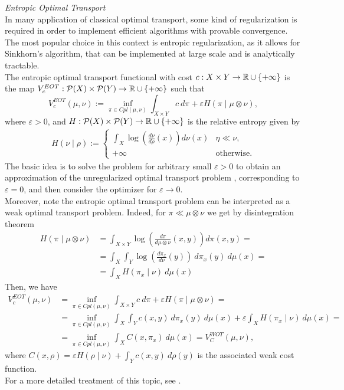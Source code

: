 \documentclass[../main.tex]{subfiles}
\begin{document}
\begin{example} \textit{Entropic Optimal Transport} \\
    In many application of classical optimal transport, some kind of regularization is required in order to implement efficient algorithms with provable convergence. The most popular choice in this context is entropic regularization, as it allows for Sinkhorn's algorithm, that can be implemented at large scale and is analytically tractable. \\
    The entropic optimal transport functional with cost $c: X \times Y \to \mathbb{R}\cup\{+\infty\}$ is the map $V^{EOT}_c : \mathcal{P}(X) \times \mathcal{P}(Y) \to \mathbb{R}\cup\{+\infty\}$ such that 
    $$
    V^{EOT}_c(\mu, \nu) := \inf_{\pi\in Cpl(\mu, \nu)} \int_{X\times Y} c \ d\pi + \varepsilon H(\pi \mid \mu\otimes\nu),
    $$
    where $\varepsilon>0$, and $H : \mathcal{P}(X)\times \mathcal{P}(Y) \to \mathbb{R}\cup\{+\infty\}$ is the relative entropy given by
    \begin{align*}
        H(\nu \mid \rho) :=
        \begin{cases}
            \int_X \log\left(\frac{d\nu}{d\rho}(x)\right) d\nu(x) & \eta \ll \nu, \\
            +\infty & \text{otherwise}.
        \end{cases}
    \end{align*} 
    The basic idea is to solve the problem for arbitrary  small $\varepsilon>0$ to obtain an approximation of the unregularized optimal transport problem , corresponding to $\varepsilon=0$, and then consider the optimizer for $\varepsilon\to 0$. \\
    Moreover, note the entropic optimal transport problem can be interpreted as a weak optimal transport problem. Indeed, for $\pi \ll \mu\otimes\nu$ we get by disintegration theorem 
    \begin{align*}
        H(\pi \mid \mu\otimes\nu) 
        &= \int_{X\times Y} \log\left(\frac{d\pi}{d\mu\otimes\nu}(x, y)\right) d\pi(x, y) = \\
        &= \int_X \int_Y  \log\left(\frac{d\pi_x}{d\nu}(y)\right) \ d\pi_x(y) \ d\mu(x) = \\
        &= \int_X H(\pi_x \mid \nu)  \ d\mu(x)
    \end{align*}
    Then, we have
    \begin{align*}
        V^{EOT}_c(\mu, \nu) 
        &= \inf_{\pi\in Cpl(\mu, \nu)} \int_{X\times Y} c \ d\pi + \varepsilon H(\pi \mid \mu\otimes\nu) = \\
        &= \inf_{\pi\in Cpl(\mu, \nu)} \int_X \int_Y c(x, y) \ d\pi_x(y) \ d\mu(x) + \varepsilon \int_X H(\pi_x \mid \nu)  \ d\mu(x) = \\
        &= \inf_{\pi\in Cpl(\mu, \nu)} \int_X C(x, \pi_x) \ d\mu(x) = V^{WOT}_C(\mu, \nu),
    \end{align*}
    where $C(x, \rho) = \varepsilon H(\rho \mid \nu) + \int_Y c(x, y) \ d\rho(y)$ is the associated weak cost function. \\
    For a more detailed treatment of this topic, see \cite{entropicOT}.
\end{example}
\end{document}
